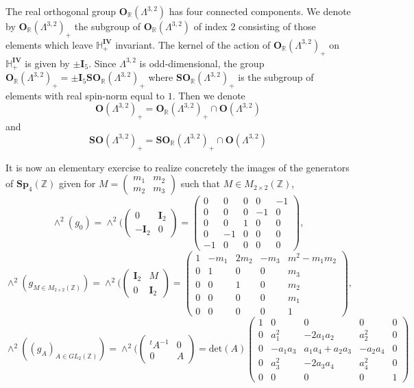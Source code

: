 \documentclass[9pt]{amsart} \usepackage[utf8]{inputenc}
\newcommand{\Z}{\mathbb{Z}} \newcommand{\C}{\mathbb{C}}
\newcommand{\R}{\mathbb{R}} \newcommand{\La}{\Lambda}
\newcommand{\Sp}{\mathbf{Sp}}
\newcommand{\Orth}{\mathbf{O}}
\newcommand{\SO}{\mathbf{SO}}
\newcommand{\Hpl}{\mathbb{H}}
\newcommand{\IV}{\mathbf{IV}}
\newcommand{\Id}{\mathbf{I}}
\begin{document}
The real orthogonal group $\Orth_{\R}(\La^{3,2})$ has four connected
components. We denote by $\Orth_{\R}(\La^{3,2})_+$ the subgroup of
$\Orth_{\R}(\La^{3,2})$ of index $2$ consisting of those elements which
leave $\Hpl_+^{\IV}$ invariant. The kernel of the action of
$\Orth_{\R}(\La^{3,2})_+$ on $\Hpl_+^{\IV}$ is given by $\pm \Id_5$. Since
$\La^{3,2}$ is odd-dimensional, the group $\Orth_{\R}(\La^{3,2})_+ =
\pm\Id_5\SO_{\R}(\La^{3,2})_+$ where $\SO_{\R}(\La^{3,2})_+$ is the
subgroup of elements with real spin-norm equal to $1$. Then we denote
$$\Orth(\La^{3,2})_+ = \Orth_{\R}(\La^{3,2})_+ \cap \Orth(\La^{3,2})$$
and $$\SO(\La^{3,2})_+ = \SO_{\R}(\La^{3,2})_+ \cap \Orth(\La^{3,2})$$

It is now an elementary exercise to realize concretely the images of the
generators of $\Sp_4(\Z)$ given for $M=\begin{pmatrix} m_1 & m_2\\
m_2 & m_3\end{pmatrix}$ such that $M \in M_{2\times2}(\Z)$,
$$\wedge^2(g_0) = \wedge^2(\begin{pmatrix}0 & \Id_2 \\ -\Id_2 &
0\end{pmatrix} = \begin{pmatrix}
0 & 0 & 0 & 0 & -1\\
0 & 0 & 0 & -1 & 0\\
0 & 0 & 1 & 0 & 0\\
0 & -1 & 0 & 0 & 0\\
-1 & 0 & 0 & 0 & 0
\end{pmatrix},$$
$$\wedge^2(g_{M \in M_{2\times2}(\Z)}) = \wedge^2(\begin{pmatrix}\Id_2 & M\\ 0 &
\Id_2\end{pmatrix} = \begin{pmatrix}1 & -m_1 & 2m_2 & -m_3 & m^2 - m_1 m_2\\
0 & 1 & 0 & 0 & m_3\\
0 & 0 & 1 & 0 & m_2\\
0 & 0 & 0 & 0 & m_1\\
0 & 0 & 0 & 0 & 1\end{pmatrix},$$
$$\wedge^2((g_A)_{A\in GL_2(\Z)}) = \wedge^2(\begin{pmatrix}{}^tA^{-1} &
0\\0 & A\end{pmatrix} = \text{det}(A)\begin{pmatrix}1 & 0 & 0 & 0 & 0\\
0 & a_1^2 & -2a_1a_2 & a_2^2 & 0\\
0 & -a_1a_3 & a_1a_4 + a_2a_3 & -a_2a_4 & 0\\
0 & a_3^2 & -2a_3a_4 & a_4^2 & 0\\
0 & 0 & 0 & 0 & 1\end{pmatrix}$$
\end{document}
